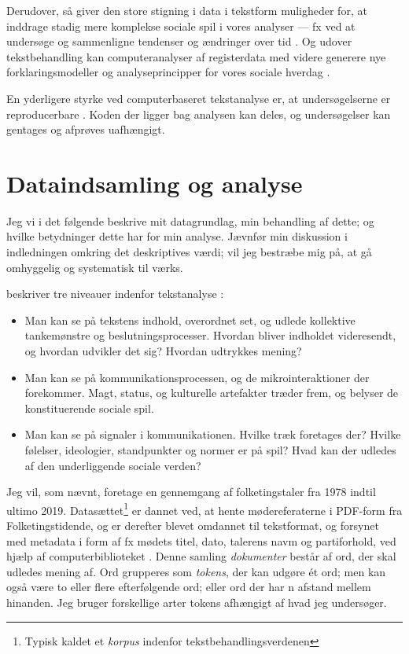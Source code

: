 Derudover, så giver den store stigning i data i tekstform muligheder for, at inddrage stadig mere komplekse sociale spil i vores analyser — fx ved at undersøge og sammenligne tendenser og ændringer over tid \autocite{evansMachineTranslationMining2016}.
Og udover tekstbehandling kan computeranalyser af registerdata med videre generere nye forklaringsmodeller og analyseprincipper for vores sociale hverdag \autocite{evansComputationSociologicalImagination2019}.

En yderligere styrke ved computerbaseret tekstanalyse er, at undersøgelserne er reproducerbare \autocite[s. 13]{kwartlerTextMiningPractice2017}.
Koden der ligger bag analysen kan deles, og undersøgelser kan gentages og afprøves uafhængigt.

\chapter{Dataindsamling og analyse}\label{chap:data}

Jeg vi i det følgende beskrive mit datagrundlag, min behandling af dette; og hvilke betydninger dette har for min analyse.
Jævnfør min diskussion i indledningen omkring det deskriptives værdi; vil jeg bestræbe mig på, at gå omhyggelig og systematisk til værks.

\citeauthor{evansMachineTranslationMining2016} beskriver tre niveauer indenfor tekstanalyse \autocite[s. 34]{evansMachineTranslationMining2016}:
\begin{itemize}
  \item
    Man kan se på tekstens indhold, overordnet set, og udlede kollektive tankemønstre og beslutningsprocesser.
    Hvordan bliver indholdet videresendt, og hvordan udvikler det sig?
    Hvordan udtrykkes mening?
  \item
    Man kan se på kommunikationsprocessen, og de mikrointeraktioner der forekommer.
    Magt, status, og kulturelle artefakter træder frem, og belyser de konstituerende sociale spil.
  \item
    Man kan se på signaler i kommunikationen.
    Hvilke træk foretages der?
    Hvilke følelser, ideologier, standpunkter og normer er på spil?
    Hvad kan der udledes af den underliggende sociale verden?
\end{itemize}

Jeg vil, som nævnt, foretage en gennemgang af folketingstaler fra 1978 indtil ultimo 2019.
Datasættet\footnote{Typisk kaldet et \textit{korpus} indenfor tekstbehandlingsverdenen} er dannet ved, at hente mødereferaterne i PDF-form fra Folketingstidende, og er derefter blevet omdannet til tekstformat, og forsynet med metadata i form af fx mødets titel, dato, talerens navm og partiforhold, ved hjælp af computerbiblioteket  \autocite{pedersenFolketinget2019}.
Denne samling \textit{dokumenter} består af ord, der skal udledes mening af.
Ord grupperes som \textit{tokens}, der kan udgøre ét ord; men kan også være to eller flere efterfølgende ord; eller ord der har n afstand mellem hinanden.
Jeg bruger forskellige arter tokens afhængigt af hvad jeg undersøger.

